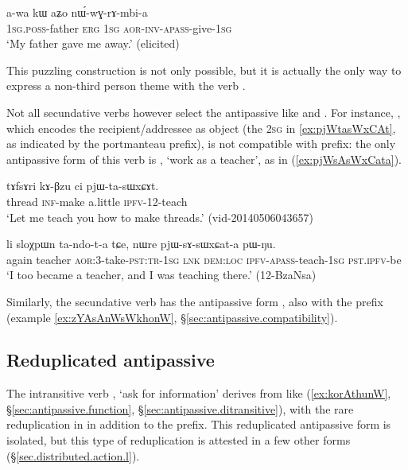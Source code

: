  \begin{exe}
\ex \label{ex:nWwGrAmbia2}
\gll  a-wa kɯ aʑo nɯ́-wɣ-rɤ-mbi-a \\
\textsc{1sg}.\textsc{poss}-father \textsc{erg} \textsc{1sg} \textsc{aor}-\textsc{inv}-\textsc{apass}-give-\textsc{1sg} \\
\glt `My father gave me away.' (elicited)
\end{exe}

This puzzling construction is not only possible, but it is actually the only way to express a non-third person theme with the verb .
 
Not all secundative verbs however select the  antipassive like  and  . For instance, , which encodes the recipient/addressee as object (the \textsc{2sg} in \ref{ex:pjWtasWxCAt}, as indicated by the  portmanteau prefix), is not compatible with  prefix: the only antipassive form of this verb is , `work as a teacher', as in (\ref{ex:pjWsAsWxCata}).

\begin{exe}
\ex \label{ex:pjWtasWxCAt}
\gll tɤfsɤri kɤ-βzu ci pjɯ-ta-sɯxɕɤt. \\
thread \textsc{inf}-make a.little \textsc{ipfv}-1\fl{}2-teach \\
\glt `Let me teach you how to make threads.' (vid-20140506043657)
\end{exe}

\begin{exe}
\ex \label{ex:pjWsAsWxCata}
\gll li sloχpɯn ta-ndo-t-a tɕe, nɯre pjɯ-sɤ-sɯxɕat-a pɯ-ŋu. \\
again teacher \textsc{aor}:3\flobv{}-take-\textsc{pst}:\textsc{tr}-\textsc{1sg} \textsc{lnk} \textsc{dem}:\textsc{loc} \textsc{ipfv}-\textsc{apass}-teach-\textsc{1sg} \textsc{pst}.\textsc{ipfv}-be \\
\glt `I too became a teacher, and I was teaching there.' (12-BzaNsa) 
\end{exe} 

Similarly, the secundative verb  has the antipassive form , also with the  prefix (example \ref{ex:zYAsAnWsWkhonW}, §\ref{sec:antipassive.compatibility}).

 \subsection{Reduplicated antipassive} \label{sec:antipassive.redp}
  
The intransitive verb , `ask for information' derives from  like  (\ref{ex:korAthunW}, §\ref{sec:antipassive.function}, §\ref{sec:antipassive.ditransitive}), with the rare reduplication in  in addition to the  prefix. This reduplicated antipassive form is isolated, but this type of reduplication is attested in a few other forms (§\ref{sec.distributed.action.l}).

